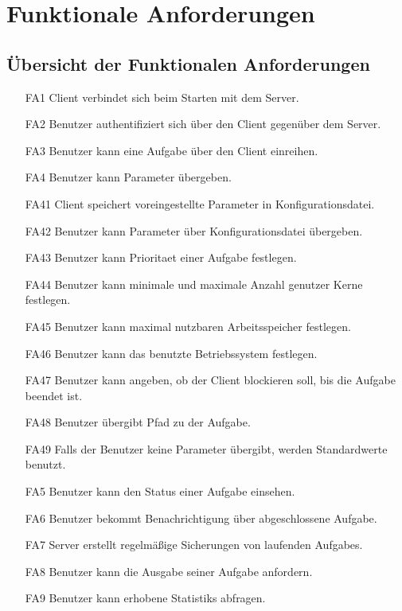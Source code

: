 \documentclass[a4paper,12pt]{article}
\begin{document}
\section{Funktionale Anforderungen}

\subsection{Übersicht der  Funktionalen Anforderungen}

\begin{itemize}[nosep]
\leftskip=0.5cm

\item[FA1]	\gls{Client} verbindet sich beim Starten mit dem \gls{Server}.
\item[FA2] \gls{Benutzer} authentifiziert sich über den \gls{Client} gegenüber dem \gls{Server}.
\item[FA3] \gls{Benutzer} kann eine \gls{Aufgabe} über den \gls{Client} einreihen.
\item[FA4] \gls{Benutzer} kann \gls{Parameter} übergeben.
\item[FA41]	\gls{Client} speichert voreingestellte \gls{Parameter} in \gls{Konfigurationsdatei}.
\item[FA42]	\gls{Benutzer} kann \gls{Parameter} über \gls{Konfigurationsdatei} übergeben.
\item[FA43] \gls{Benutzer} kann \gls{Prioritaet} einer \gls{Aufgabe} festlegen.
\item[FA44] \gls{Benutzer} kann minimale und maximale Anzahl genutzer Kerne festlegen.
\item[FA45] \gls{Benutzer} kann maximal nutzbaren Arbeitsspeicher festlegen.
\item[FA46] \gls{Benutzer} kann das benutzte Betriebssystem festlegen.
\item[FA47] \gls{Benutzer} kann angeben, ob der \gls{Client} blockieren soll, bis die \gls{Aufgabe} beendet ist.
\item[FA48] \gls{Benutzer} übergibt Pfad zu der \gls{Aufgabe}.
\item[FA49] Falls der \gls{Benutzer} keine \gls{Parameter} übergibt, werden Standardwerte benutzt.
\item[FA5] \gls{Benutzer} kann den Status einer \gls{Aufgabe} einsehen.
\item[FA6] \gls{Benutzer} bekommt Benachrichtigung über abgeschlossene \gls{Aufgabe}.
\item[FA7] \gls{Server} erstellt regelmäßige Sicherungen von laufenden \glspl{Aufgabe}.
\item[FA8] \gls{Benutzer} kann die Ausgabe seiner \gls{Aufgabe} anfordern.
\item[FA9] \gls{Benutzer} kann erhobene \glspl{Statistik} abfragen.
\end{itemize}
\newpage
\end{document}
